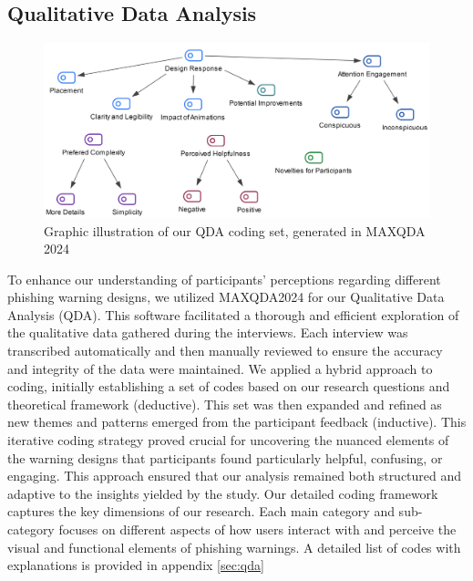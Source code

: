\documentclass[
  a4paper,  %
  twoside,  %
  bibliography=totoc,
  headsepline,
  cleardoublepage=empty,
  parskip=half,
  draft=false
]{scrbook}
\begin{document}
\subsection{Qualitative Data Analysis}
\begin{figure} [ht]
    \centering
    \includegraphics[width=1\linewidth]{figures/coding.png}
    \caption{Graphic illustration of our QDA coding set, generated in MAXQDA 2024}
    \label{fig:qda}
\end{figure}
To enhance our understanding of participants' perceptions regarding different phishing warning designs, we utilized MAXQDA2024 for our Qualitative Data Analysis (QDA). This software facilitated a thorough and efficient exploration of the qualitative data gathered during the interviews. Each interview was transcribed automatically and then manually reviewed to ensure the accuracy and integrity of the data were maintained. \newline
We applied a hybrid approach to coding, initially establishing a set of codes based on our research questions and theoretical framework (deductive). This set was then expanded and refined as new themes and patterns emerged from the participant feedback (inductive). This iterative coding strategy proved crucial for uncovering the nuanced elements of the warning designs that participants found particularly helpful, confusing, or engaging. This approach ensured that our analysis remained both structured and adaptive to the insights yielded by the study. \newline
Our detailed coding framework captures the key dimensions of our research. Each main category and sub-category focuses on different aspects of how users interact with and perceive the visual and functional elements of phishing warnings. A detailed list of codes with explanations is provided in appendix \ref{sec:qda}
\end{document}
